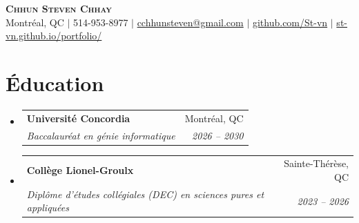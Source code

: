 \documentclass[letterpaper,11pt]{article}
\makeatletter
\newcommand{\resumeSubheading}[4]{
  \vspace{-2pt}\item
    \begin{tabular*}{0.97\textwidth}[t]{l@{\extracolsep{\fill}}r}
      \textbf{#1} & #2 \\
      \textit{\small#3} & \textit{\small #4} \\
    \end{tabular*}\vspace{-7pt}
}
\newcommand{\resumeSubHeadingListStart}{\begin{itemize}[leftmargin=0.15in, label={}, nosep]}
\newcommand{\resumeSubHeadingListEnd}{\end{itemize}}
\makeatother
\begin{document}
\begin{center}
    \textbf{\Huge \scshape Chhun Steven Chhay} \\ \vspace{1pt}
    \small Montréal, QC $|$ 514-953-8977 $|$ \href{mailto:cchhunsteven@gmail.com}{cchhunsteven@gmail.com} $|$ 
    \href{https://github.com/St-vn}{github.com/St-vn} $|$
    \href{https://st-vn.github.io/portfolio/}{st-vn.github.io/portfolio/}
\end{center}

\section{Éducation}
  \resumeSubHeadingListStart
    \resumeSubheading
      {Université Concordia}{Montréal, QC}
      {Baccalauréat en génie informatique}{2026 -- 2030}
    \resumeSubheading
      {Coll\`{e}ge Lionel-Groulx}{Sainte-Th\'{e}r\`{e}se, QC}
      {Diplôme d'études collégiales (DEC) en sciences pures et appliquées}{2023 -- 2026}
  \resumeSubHeadingListEnd

\end{document}
